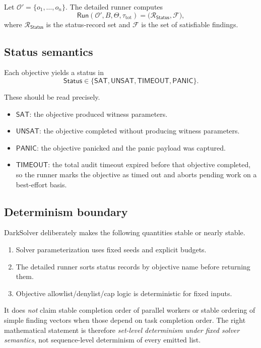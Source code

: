 \documentclass[11pt]{article}
\numberwithin{equation}{section}
\theoremstyle{remark}
\newcommand{\Ctx}{\Theta}
\newcommand{\sat}{\mathsf{SAT}}
\newcommand{\unsat}{\mathsf{UNSAT}}
\newcommand{\timeout}{\mathsf{TIMEOUT}}
\newcommand{\panicstatus}{\mathsf{PANIC}}
\newcommand{\Status}{\mathsf{Status}}
\newcommand{\Objectives}{\mathcal{O}}
\begin{document}
Let \(\Objectives' = \{o_1,\ldots,o_n\}\). The detailed runner computes
\begin{equation}
\label{eq:parallel-run}
\mathsf{Run}(\Objectives', B, \Ctx, \tau_{\mathrm{tot}})
=
\big(
\mathcal{R}_{\Status},
\mathcal{F}
\big),
\end{equation}
where \(\mathcal{R}_{\Status}\) is the status-record set and \(\mathcal{F}\) is the set of satisfiable findings.

\subsection{Status semantics}

Each objective yields a status in
\begin{equation}
\label{eq:status-domain}
\Status \in \{\sat,\unsat,\timeout,\panicstatus\}.
\end{equation}

These should be read precisely.
\begin{itemize}[leftmargin=1.5em]
  \item \(\sat\): the objective produced witness parameters.
  \item \(\unsat\): the objective completed without producing witness parameters.
  \item \(\panicstatus\): the objective panicked and the panic payload was captured.
  \item \(\timeout\): the total audit timeout expired before that objective completed, so the runner marks the objective as timed out and aborts pending work on a best-effort basis.
\end{itemize}

\subsection{Determinism boundary}

DarkSolver deliberately makes the following quantities stable or nearly stable.
\begin{enumerate}[leftmargin=1.5em]
  \item Solver parameterization uses fixed seeds and explicit budgets.
  \item The detailed runner sorts status records by objective name before returning them.
  \item Objective allowlist/denylist/cap logic is deterministic for fixed inputs.
\end{enumerate}

It does \emph{not} claim stable completion order of parallel workers or stable ordering of simple finding vectors when those depend on task completion order. The right mathematical statement is therefore \emph{set-level determinism under fixed solver semantics}, not sequence-level determinism of every emitted list.
\end{document}
